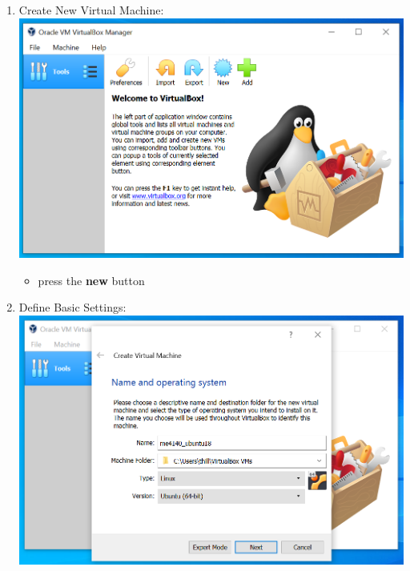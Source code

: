 \documentclass[12pt]{article}
\begin{document}
\begin{description}
\begin{description}
\begin{enumerate}[label=\alph*)]
	\item Create New Virtual Machine:  \vspace{5mm} \\
      		\hspace*{-2.5cm}\includegraphics[scale=.55]{Capture3.png}\\
               \begin{itemize}
                
	\item press the {\bf new} button

                
            \end{itemize}
   
   \newpage         
          \item Define Basic Settings:  \vspace{5mm} \\  
            \hspace*{-2.5cm}\includegraphics[scale=.55]{Capture4.png}\\
\begin{itemize}
                

\end{itemize}
\end{enumerate}
\end{description}
\end{description}
\end{document}
